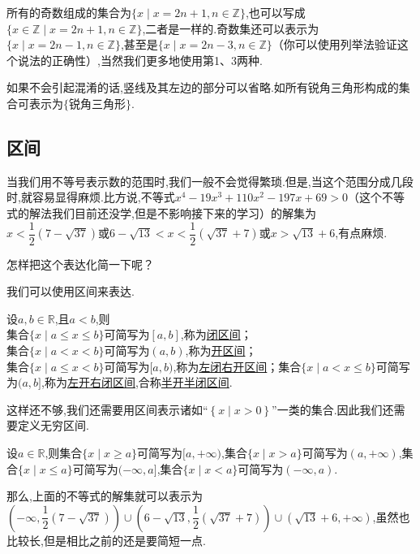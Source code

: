 \documentclass[lang=cn,math=cm,chinesefont=nofont,11pt,scheme=chinese,twocol]{elegantbook}
\begin{document}
\begin{example}
  \label{exp:1}
  所有的奇数组成的集合为$\{x\mid x=2n+1,n\in\mathbb{Z}\}$,也可以写成$\{x\in\mathbb{Z}\mid x=2n+1,n\in\mathbb{Z}\}$,二者是一样的.奇数集还可以表示为$\{x\mid x=2n-1,n\in\mathbb{Z}\}$,甚至是$\{x\mid x=2n-3,n\in\mathbb{Z}\}$（你可以使用列举法验证这个说法的正确性）,当然我们更多地使用第1、3两种.
\end{example}

如果不会引起混淆的话,竖线及其左边的部分可以省略.如所有锐角三角形构成的集合可表示为$\{\text{锐角三角形}\}$.

\subsection{区间}
当我们用不等号表示数的范围时,我们一般不会觉得繁琐.但是,当这个范围分成几段时,就容易显得麻烦.比方说,不等式$x^4-19x^3+110x^2-197x+69>0$（这个不等式的解法我们目前还没学,但是不影响接下来的学习）的解集为$x<\dfrac{1}{2} \left(7-\sqrt{37}\right)\text{或}6-\sqrt{13}<x<\dfrac{1}{2} \left(\sqrt{37}+7\right)\text{或}x>\sqrt{13}+6$,有点麻烦.

怎样把这个表达化简一下呢？

我们可以使用区间来表达.

\begin{definition}[区间]
	设$a,b\in\mathbb{R}$,且$a<b$,则\\集合$\{x\mid a\leq x\leq b\}$可简写为$[a,b]$,称为\underline{闭区间}；\\集合$\{x\mid a<x<b\}$可简写为$(a,b)$,称为\underline{开区间}；\\集合$\{x\mid a\leq x<b\}$可简写为$[a,b)$,称为\underline{左闭右开区间}；集合$\{x\mid a< x\leq b\}$可简写为$(a,b]$,称为\underline{左开右闭区间},合称\underline{半开半闭区间}.
\end{definition}

这样还不够,我们还需要用区间表示诸如“$\left\{x\mid x>0\right\}$”一类的集合.因此我们还需要定义无穷区间.

\begin{definition}[无穷区间]
    设$a\in\mathbb{R}$,则集合$\{x\mid x\geq a\}$可简写为$[a,+\infty)$,集合$\{x\mid x>a\}$可简写为$(a,+\infty)$,集合$\{x\mid x\leq a\}$可简写为$(-\infty,a]$,集合$\{x\mid x<a\}$可简写为$(-\infty,a)$.
\end{definition}

那么,上面的不等式的解集就可以表示为$(-\infty,\dfrac{1}{2} \left(7-\sqrt{37}\right))\cup (6-\sqrt{13},\dfrac{1}{2} \left(\sqrt{37}+7\right))\cup (\sqrt{13}+6,+\infty)$,虽然也比较长,但是相比之前的还是要简短一点.
\end{document}
